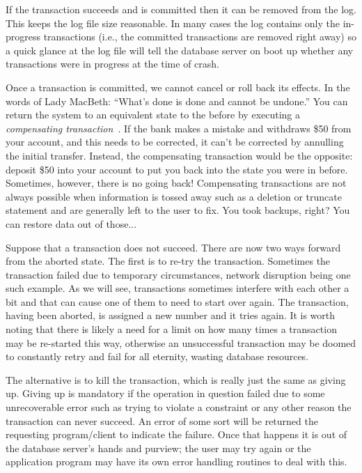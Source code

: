 \documentclass[a4paper]{report}
\begin{document}
If the transaction succeeds and is committed then it can be removed from the log. This keeps the log file size reasonable. In many cases the log contains only the in-progress transactions (i.e., the committed transactions are removed right away) so a quick glance at the log file will tell the database server on boot up whether any transactions were in progress at the time of crash.

Once a transaction is committed, we cannot cancel or roll back its effects. In the words of Lady MacBeth: ``What's done is done and cannot be undone.'' You can return the system to an equivalent state to the before by executing a \textit{compensating transaction}~\cite{dsc}. If the bank makes a mistake and withdraws \$50 from your account, and this needs to be corrected, it can't be corrected by annulling the initial transfer. Instead, the compensating transaction would be the opposite: deposit \$50 into your account to put you back into the state you were in before. Sometimes, however, there is no going back! Compensating transactions are not always possible when information is tossed away such as a deletion or truncate statement and are generally left to the user to fix. You took backups, right? You can restore data out of those... 

Suppose that a transaction does not succeed. There are now two ways forward from the aborted state. The first is to re-try the transaction. Sometimes the transaction failed due to temporary circumstances, network disruption being one such example. As we will see, transactions sometimes interfere with each other a bit and that can cause one of them to need to start over again. The transaction, having been aborted, is assigned a new number and it tries again. It is worth noting that there is likely a need for a limit on how many times a transaction may be re-started this way, otherwise an unsuccessful transaction may be doomed to constantly retry and fail for all eternity, wasting database resources.

The alternative is to kill the transaction, which is really just the same as giving up. Giving up is mandatory if the operation in question failed due to some unrecoverable error such as trying to violate a constraint or any other reason the transaction can never succeed. An error of some sort will be returned the requesting program/client to indicate the failure. Once that happens it is out of the database server's hands and purview; the user may try again or the application program may have its own error handling routines to deal with this.
\end{document}

